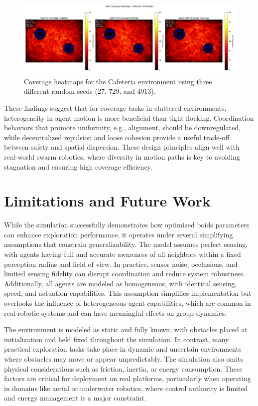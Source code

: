 \documentclass[12pt]{article}
\begin{document}
\begin{figure}[h!]
\centering
\includegraphics[width=\linewidth]{heatmaps/cafeteria_100.png}
\caption{Coverage heatmaps for the Cafeteria environment using three different random seeds (27, 729, and 4913).}
\label{fig:caf_heatmap}
\end{figure}

These findings suggest that for coverage tasks in cluttered environments, heterogeneity in agent motion is more beneficial than tight flocking. Coordination behaviors that promote uniformity, e.g., alignment, should be downregulated, while decentralized repulsion and loose cohesion provide a useful trade-off between safety and spatial dispersion. These design principles align well with real-world swarm robotics, where diversity in motion paths is key to avoiding stagnation and ensuring high coverage efficiency.

\section{Limitations and Future Work}

\sloppypar
While the simulation successfully demonstrates how optimized boids parameters can enhance exploration performance, it operates under several simplifying assumptions that constrain generalizability. The model assumes perfect sensing, with agents having full and accurate awareness of all neighbors within a fixed perception radius and field of view. In practice, sensor noise, occlusions, and limited sensing fidelity can disrupt coordination and reduce system robustness. Additionally, all agents are modeled as homogeneous, with identical sensing, speed, and actuation capabilities. This assumption simplifies implementation but overlooks the influence of heterogeneous agent capabilities, which are common in real robotic systems and can have meaningful effects on group dynamics.

The environment is modeled as static and fully known, with obstacles placed at initialization and held fixed throughout the simulation. In contrast, many practical exploration tasks take place in dynamic and uncertain environments where obstacles may move or appear unpredictably. The simulation also omits physical considerations such as friction, inertia, or energy consumption. These factors are critical for deployment on real platforms, particularly when operating in domains like aerial or underwater robotics, where control authority is limited and energy management is a major constraint.
\end{document}
